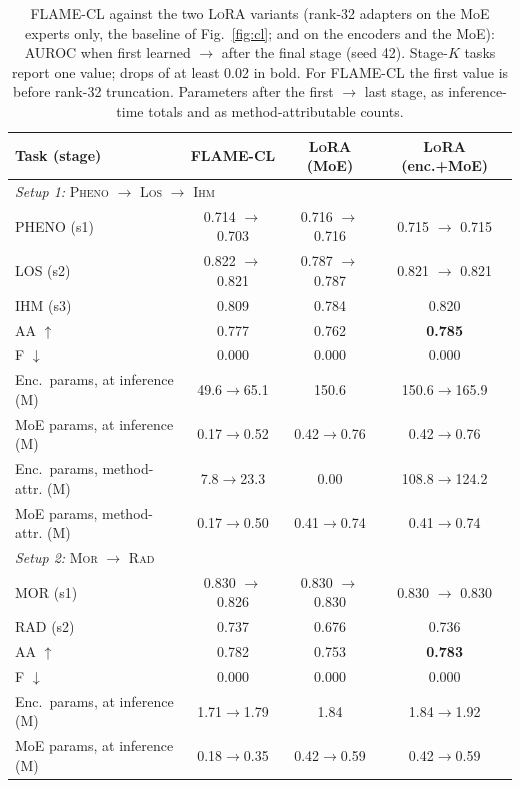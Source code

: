 \begin{table}[t]
\centering
\footnotesize
\setlength{\tabcolsep}{3.5pt}
\caption{\textsc{FLAME-CL} against the two \textsc{LoRA} variants (rank-32 adapters on the MoE experts only, the baseline of Fig.~\ref{fig:cl}; and on the encoders and the MoE): AUROC when first learned $\to$ after the final stage (seed 42). Stage-$K$ tasks report one value; drops of at least 0.02 in bold. For \textsc{FLAME-CL} the first value is before rank-32 truncation. Parameters after the first $\to$ last stage, as inference-time totals and as method-attributable counts.}
\label{tab:cl-lora-variants}
\begin{tabular}{lccc}
\toprule
Task (stage) & \textsc{FLAME-CL} & \textsc{LoRA} (MoE) & \textsc{LoRA} (enc.+MoE) \\
\midrule
\multicolumn{4}{l}{\emph{Setup 1:} \textsc{Pheno} $\to$ \textsc{Los} $\to$ \textsc{Ihm}} \\
\addlinespace[1pt]
PHENO (s1) & 0.714 $\to$ 0.703 & 0.716 $\to$ 0.716 & 0.715 $\to$ 0.715 \\
LOS (s2) & 0.822 $\to$ 0.821 & 0.787 $\to$ 0.787 & 0.821 $\to$ 0.821 \\
IHM (s3) & 0.809 & 0.784 & 0.820 \\
\addlinespace[1pt]
AA $\uparrow$ & 0.777 & 0.762 & \textbf{0.785} \\
F $\downarrow$ & 0.000 & 0.000 & 0.000 \\
Enc.\ params, at inference (M) & 49.6$\to$65.1 & 150.6 & 150.6$\to$165.9 \\
MoE params, at inference (M) & 0.17$\to$0.52 & 0.42$\to$0.76 & 0.42$\to$0.76 \\
Enc.\ params, method-attr. (M) & 7.8$\to$23.3 & 0.00 & 108.8$\to$124.2 \\
MoE params, method-attr. (M) & 0.17$\to$0.50 & 0.41$\to$0.74 & 0.41$\to$0.74 \\
\midrule
\multicolumn{4}{l}{\emph{Setup 2:} \textsc{Mor} $\to$ \textsc{Rad}} \\
\addlinespace[1pt]
MOR (s1) & 0.830 $\to$ 0.826 & 0.830 $\to$ 0.830 & 0.830 $\to$ 0.830 \\
RAD (s2) & 0.737 & 0.676 & 0.736 \\
\addlinespace[1pt]
AA $\uparrow$ & 0.782 & 0.753 & \textbf{0.783} \\
F $\downarrow$ & 0.000 & 0.000 & 0.000 \\
Enc.\ params, at inference (M) & 1.71$\to$1.79 & 1.84 & 1.84$\to$1.92 \\
MoE params, at inference (M) & 0.18$\to$0.35 & 0.42$\to$0.59 & 0.42$\to$0.59 \\

\end{tabular}
\end{table}

